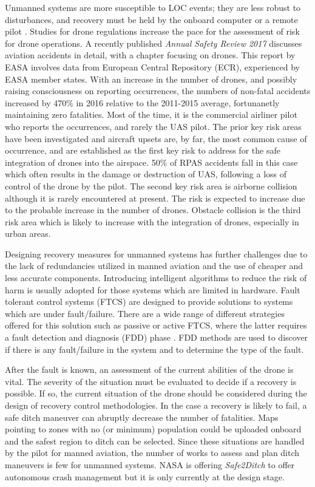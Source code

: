 Unmanned systems are more susceptible to LOC events; they are less robust to disturbances, and recovery must be held by the onboard computer or a remote pilot \cite{richards2016vehicle}.
Studies for drone regulations increase the pace for the assessment of risk for drone operations. A recently published \emph{Annual Safety Review 2017} \cite{annualSafetyReview} discusses aviation accidents in detail, with a chapter focusing on drones. 
This report by EASA involves data from European Central Repository (ECR), experienced by EASA member states.
With an increase in the number of drones, and possibly raising consciousness on reporting occurrences, the numbers of non-fatal accidents increased by 470\% in 2016 relative to the 2011-2015 average, fortunanetly maintaining zero fatalities. 
Most of the time, it is the commercial airliner pilot who reports the occurrences, and rarely the UAS pilot.
The prior key risk areas have been investigated and aircraft upsets are, by far, the most common cause of occurrence, and are established as the first key risk to address for the safe integration of drones into the airspace. 
50\% of RPAS accidents fall in this case which often results in the damage or destruction of UAS, following a loss of control of the drone by the pilot.
The second key risk area is airborne collision although it is rarely encountered at present. The risk is expected to increase due to the probable increase in the number of drones. 
Obstacle collision is the third risk area which is likely to increase with the integration of drones, especially in urban areas.

Designing recovery measures for unmanned systems has further challenges due to the lack of redundancies utilized in manned aviation and the use of cheaper and less accurate components.
Introducing intelligent algorithms to reduce the risk of harm is usually adopted for those systems which are limited in hardware. 
Fault tolerant control systems (FTCS) are designed to provide solutions to systems which are under fault/failure. 
There are a wide range of different strategies offered for this solution such as passive or active FTCS, where the latter requires a fault detection and diagnosis (FDD) phase \cite{ducard2009fault}. 
FDD methods are used to discover if there is any fault/failure in the system and to determine the type of the fault. 

After the fault is known, an assessment of the current abilities of the drone is vital. 
The severity of the situation must be evaluated to decide if a recovery is possible. 
If so, the current situation of the drone should be considered during the design of recovery control methodologies.
In the case a recovery is likely to fail, a safe ditch maneuver can abruptly decrease the number of fatalities. 
Maps pointing to zones with no (or minimum) population could be uploaded onboard and the safest region to ditch can be selected. 
Since these situations are handled by the pilot for manned aviation, the number of works to assess and plan ditch maneuvers is few for unmanned systems. 
NASA is offering \emph{Safe2Ditch} \cite{nasa:safe2ditch} to offer autonomous crash management but it is only currently at the design stage.


